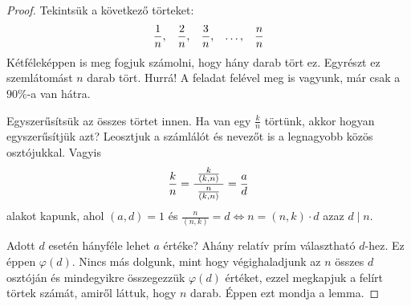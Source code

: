 \documentclass[12pt]{book}
\theoremstyle{plain} %
\theoremstyle{definition} %
\theoremstyle{remark}
\numberwithin{equation}{section}  %
\begin{document}
	\begin{proof}
		Tekintsük a következő törteket:
		\[ \dfrac{1}{n}, \hspace{3mm} \dfrac{2}{n}, \hspace{3mm} \dfrac{3}{n}, \hspace{3mm} \ldots, \hspace{3mm} \dfrac{n}{n} \]
		Kétféleképpen is meg fogjuk számolni, hogy hány darab tört ez. Egyrészt ez szemlátomást $n$ darab tört. Hurrá! A feladat felével meg is vagyunk, már csak a $90\%$-a van hátra.
		
		Egyszerűsítsük az összes törtet innen. Ha van egy $\frac{k}{n}$ törtünk, akkor hogyan egyszerűsítjük azt? Leosztjuk a számlálót és nevezőt is a legnagyobb közös osztójukkal. Vagyis 
		\[ \dfrac{k}{n} = \dfrac{\hspace{1mm} \frac{k}{(k,n)} \hspace{1mm}}{\frac{n}{(k,n)}} = \dfrac{a}{d} \]
		alakot kapunk, ahol $(a,d)=1$ és $\frac{n}{(n,k)} = d \Leftrightarrow n = (n,k)\cdot d$ azaz $d\mid n$.
		
		Adott $d$ esetén hányféle lehet $a$ értéke? Ahány relatív prím választható $d$-hez. Ez éppen $\varphi(d)$. Nincs más dolgunk, mint hogy végighaladjunk az $n$ összes $d$ osztóján és mindegyikre összegezzük $\varphi(d)$ értéket, ezzel megkapjuk a felírt törtek számát, amiről láttuk, hogy $n$ darab. Éppen ezt mondja a lemma.
	\end{proof}
\end{document}
